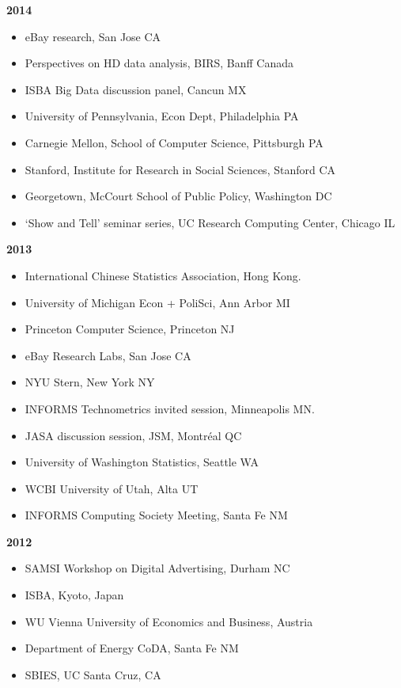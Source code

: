 \documentclass[margin,line]{res}
\begin{document}
\begin{resume}
{\bf 2014}
\begin{itemize}
\item eBay research, San Jose CA
\item Perspectives on HD data analysis, BIRS, Banff Canada
\item ISBA Big Data discussion panel, Cancun MX
\item University of Pennsylvania, Econ Dept, Philadelphia PA
\item Carnegie Mellon, School of Computer Science, Pittsburgh PA 
\item Stanford, Institute for Research in Social Sciences, Stanford CA
\item Georgetown, McCourt School of Public Policy, Washington DC
\item `Show and Tell' seminar series, UC Research Computing Center, Chicago IL
\end{itemize}

{\bf 2013}
\begin{itemize}
\item International Chinese Statistics Association, Hong Kong.
\item University of Michigan Econ + PoliSci, Ann Arbor MI
\item Princeton Computer Science, Princeton NJ
\item eBay Research Labs, San Jose CA
\item NYU Stern, New York NY
\item INFORMS Technometrics invited session, Minneapolis MN.
\item JASA discussion session, JSM, Montr\'eal QC
\item University of Washington Statistics, Seattle WA
\item WCBI University of Utah, Alta UT
\item INFORMS Computing Society Meeting, Santa Fe NM
\end{itemize}

{\bf 2012}
\begin{itemize}
\item SAMSI Workshop on Digital Advertising, Durham NC
\item ISBA, Kyoto, Japan
\item WU Vienna University of Economics and Business, Austria
\item Department of Energy CoDA, Santa Fe NM
\item SBIES, UC Santa Cruz, CA
\end{itemize}




\end{resume}
\end{document}
